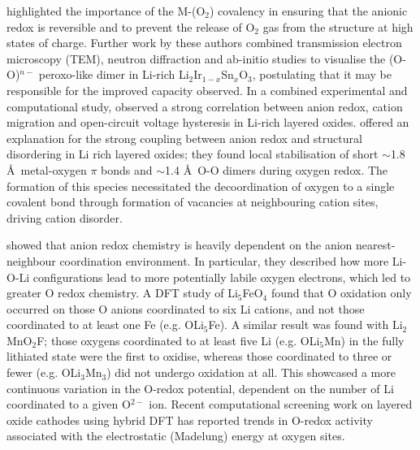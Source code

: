\documentclass[../main.tex]{subfiles}
\begin{document}
\citeauthor{Sathiya2013a} highlighted the importance of the M-(O$_2$) covalency in ensuring that the anionic redox is reversible and to prevent the release of O$_2$ gas from the structure at high states of charge.\cite{Sathiya2013a,Saubanere2016} Further work by these authors combined transmission electron microscopy (TEM), neutron diffraction and ab-initio studies to visualise the (O-O)$^{n-}$ peroxo-like dimer in Li-rich Li$_2$Ir$_{1-x}$Sn$_x$O$_3$, postulating that it may be responsible for the improved capacity observed.\cite{McCalla2015} In a combined experimental and computational study, \citeauthor{Gent2017} observed a strong correlation between anion redox, cation migration and open-circuit voltage hysteresis in Li-rich layered oxides.\cite{Gent2017} \citeauthor{Hong2019} offered an explanation for the strong coupling between anion redox and structural disordering in Li rich layered oxides; they found local stabilisation of short $\sim$1.8 \AA \ metal-oxygen $\pi$ bonds and $\sim$1.4 \AA \ O-O dimers during oxygen redox.\cite{Hong2019} The formation of this species necessitated the decoordination of oxygen to a single covalent bond through formation of vacancies at neighbouring cation sites, driving cation disorder.

\citeauthor{Seo2016} showed that anion redox chemistry is heavily dependent on the anion nearest-neighbour coordination environment.\cite{Seo2016} In particular, they described how more Li-O-Li configurations lead to more potentially labile oxygen electrons, which led to greater O redox chemistry. A DFT study of Li$_5$FeO$_4$ found that O oxidation only occurred on those O anions coordinated to six Li cations, and not those coordinated to at least one Fe (e.g. OLi$_5$Fe).\cite{Zhan2017} A similar result was found with Li$_2$MnO$_2$F; those oxygens coordinated to at least five Li (e.g. OLi$_5$Mn) in the fully lithiated state were the first to oxidise, whereas those coordinated to three or fewer (e.g. OLi$_3$Mn$_3$) did not undergo oxidation at all. This showcased a more continuous variation in the O-redox potential, dependent on the number of Li coordinated to a given O$^{2-}$ ion.\cite{Sharpe2020} Recent computational screening work on layered oxide cathodes using hybrid DFT has reported trends in O-redox activity associated with the electrostatic (Madelung) energy at oxygen sites.\cite{Davies2020}
\end{document}
